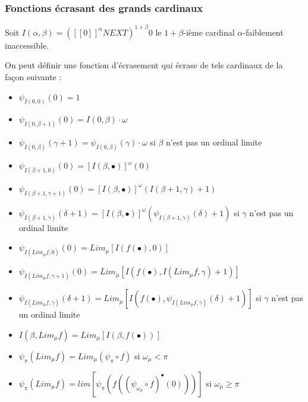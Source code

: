 \documentclass[12pt]{beamer}
\begin{document}
\begin{frame}
\frametitle{Fonctions écrasant des grands cardinaux}

Soit \( I(\alpha,\beta) = ([[0]]^{\alpha} NEXT)^{1+\beta} 0 \) le \( 1+\beta \)-ième cardinal $\alpha$-faiblement inaccessible.

On peut définir une fonction d'écrasement qui écrase de tels cardinaux de la façon suivante :

\scriptsize

\begin{itemize}
     \setlength{\itemsep}{1pt}
     \setlength{\parskip}{0pt}
     \setlength{\parsep}{0pt}

\item \( \psi_{I(0,0)}(0) = 1 \)

\item \( \psi_{I(0,\beta+1)}(0) = I(0,\beta) \cdot \omega \)

\item \( \psi_{I(0,\beta)}(\gamma+1) = \psi_{I(0,\beta)}(\gamma) \cdot \omega \) si \( \beta \) n'est pas un ordinal limite

\item \( \psi_{I(\beta+1,0)}(0) = [I(\beta,\bullet)]^\omega (0) \)

\item \( \psi_{I(\beta+1,\gamma+1)}(0) = [I(\beta,\bullet)]^\omega (I(\beta+1,\gamma)+1) \)

\item \( \psi_{I(\beta+1,\gamma)}(\delta+1) = [I(\beta,\bullet)]^\omega (\psi_{I(\beta+1,\gamma)}(\delta)+1) \) si \( \gamma \) n'est pas un ordinal limite

\item \( \psi_{I(Lim_\mu f,0)}(0) = Lim_\mu [I(f(\bullet),0)] \)

\item \( \psi_{I(Lim_\mu f,\gamma+1)}(0) = Lim_\mu [I(f(\bullet),I(Lim_\mu f,\gamma)+1)] \)

\item \( \psi_{I(Lim_\mu f,\gamma)}(\delta+1) = Lim_\mu [I(f(\bullet),\psi_{I(Lim_\mu f,\gamma)}(\delta)+1)] \) si \( \gamma \) n'est pas un ordinal limite 

\item \( I(\beta,Lim_\mu f) = Lim_\mu [I(\beta,f(\bullet))] \)

\item \( \psi_\pi(Lim_\mu f) = Lim_\mu (\psi_\pi \circ f) \) si \( \omega_\mu < \pi \)

\item \( \psi_\pi(Lim_\mu f) = lim [\psi_\pi (f ((\psi_{\omega_\mu} \circ f)^\bullet (0)))] \) si \( \omega_\mu \ge \pi \)

\end{itemize}

\end{frame}
\end{document}
